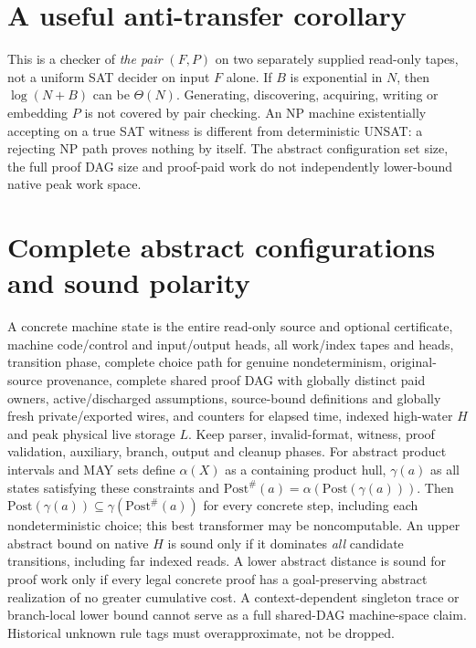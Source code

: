 \documentclass[11pt]{article}
\begin{document}
\section{A useful anti-transfer corollary}
This is a checker of \emph{the pair} $(F,P)$ on two separately supplied read-only tapes, not a uniform SAT decider on input $F$ alone. If $B$ is exponential in $N$, then $\log(N+B)$ can be $\Theta(N)$. Generating, discovering, acquiring, writing or embedding $P$ is not covered by pair checking. An NP machine existentially accepting on a true SAT witness is different from deterministic UNSAT: a rejecting NP path proves nothing by itself. The abstract configuration set size, the full proof DAG size and proof-paid work do not independently lower-bound native peak work space.

\section{Complete abstract configurations and sound polarity}
A concrete machine state is the entire read-only source and optional certificate, machine code/control and input/output heads, all work/index tapes and heads, transition phase, complete choice path for genuine nondeterminism, original-source provenance, complete shared proof DAG with globally distinct paid owners, active/discharged assumptions, source-bound definitions and globally fresh private/exported wires, and counters for elapsed time, indexed high-water $H$ and peak physical live storage $L$. Keep parser, invalid-format, witness, proof validation, auxiliary, branch, output and cleanup phases. For abstract product intervals and MAY sets define $\alpha(X)$ as a containing product hull, $\gamma(a)$ as all states satisfying these constraints and $\mathrm{Post}^{\#}(a)=\alpha(\mathrm{Post}(\gamma(a)))$. Then $\mathrm{Post}(\gamma(a))\subseteq\gamma(\mathrm{Post}^{\#}(a))$ for every concrete step, including each nondeterministic choice; this best transformer may be noncomputable. An upper abstract bound on native $H$ is sound only if it dominates \emph{all} candidate transitions, including far indexed reads. A lower abstract distance is sound for proof work only if every legal concrete proof has a goal-preserving abstract realization of no greater cumulative cost. A context-dependent singleton trace or branch-local lower bound cannot serve as a full shared-DAG machine-space claim. Historical unknown rule tags must overapproximate, not be dropped.
\end{document}
